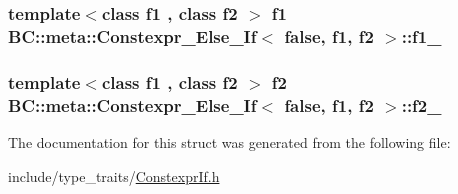 \subsubsection[{\texorpdfstring{f1\+\_\+}{f1_}}]{\setlength{\rightskip}{0pt plus 5cm}template$<$class f1 , class f2 $>$ f1 {\bf B\+C\+::meta\+::\+Constexpr\+\_\+\+Else\+\_\+\+If}$<$ false, f1, f2 $>$\+::f1\+\_\+}\hypertarget{structBC_1_1meta_1_1Constexpr__Else__If_3_01false_00_01f1_00_01f2_01_4_aa07717e0096e5b422ca535581b8eeb25}{}\label{structBC_1_1meta_1_1Constexpr__Else__If_3_01false_00_01f1_00_01f2_01_4_aa07717e0096e5b422ca535581b8eeb25}
\subsubsection[{\texorpdfstring{f2\+\_\+}{f2_}}]{\setlength{\rightskip}{0pt plus 5cm}template$<$class f1 , class f2 $>$ f2 {\bf B\+C\+::meta\+::\+Constexpr\+\_\+\+Else\+\_\+\+If}$<$ false, f1, f2 $>$\+::f2\+\_\+}\hypertarget{structBC_1_1meta_1_1Constexpr__Else__If_3_01false_00_01f1_00_01f2_01_4_a206f4404b1b22229044e5b92b676c7d0}{}\label{structBC_1_1meta_1_1Constexpr__Else__If_3_01false_00_01f1_00_01f2_01_4_a206f4404b1b22229044e5b92b676c7d0}


The documentation for this struct was generated from the following file\+:\begin{DoxyCompactItemize}
\item 
include/type\+\_\+traits/\hyperlink{ConstexprIf_8h}{Constexpr\+If.\+h}\end{DoxyCompactItemize}
